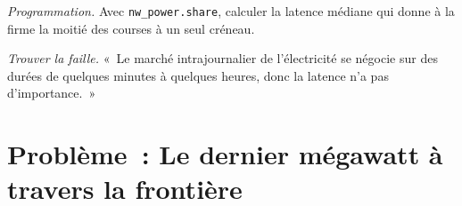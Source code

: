 \begin{exercise}[$\star\star\star$]\label{exo:nw:power-commodities-and-betting-connectivity:7}
\emph{Programmation.} Avec \texttt{nw\_power.share}, calculer la latence médiane qui donne à la firme la moitié des courses à un seul créneau.
\end{exercise}

\begin{exercise}[$\star\star\star$]\label{exo:nw:power-commodities-and-betting-connectivity:8}
\emph{Trouver la faille.} «~Le marché intrajournalier de l'électricité se négocie sur des durées de quelques minutes à quelques heures, donc la latence n'a pas d'importance.~»
\end{exercise}

\section{Problème~: Le dernier mégawatt à travers la frontière}


